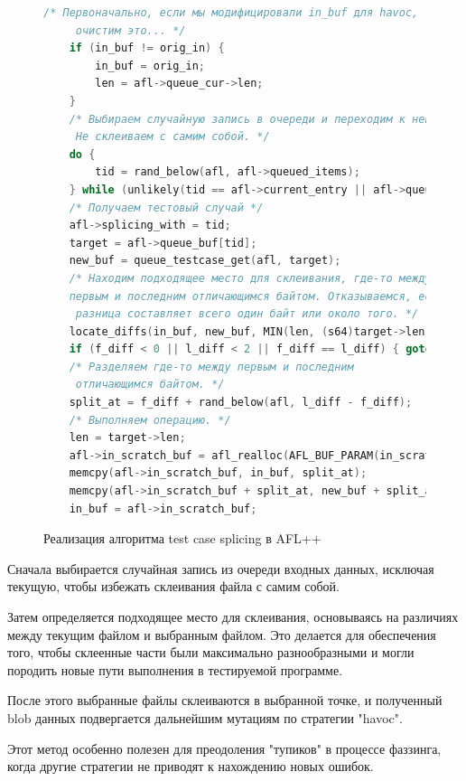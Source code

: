 \begin{figure}[ht]
	\begin{lstlisting}[language=C]
	/* Первоначально, если мы модифицировали in_buf для havoc,
	 очистим это... */
	if (in_buf != orig_in) {
		in_buf = orig_in;
		len = afl->queue_cur->len;
	}
	/* Выбираем случайную запись в очереди и переходим к ней.
	 Не склеиваем с самим собой. */
	do {
		tid = rand_below(afl, afl->queued_items);
	} while (unlikely(tid == afl->current_entry || afl->queue_buf[tid]->len < 4));
	/* Получаем тестовый случай */
	afl->splicing_with = tid;
	target = afl->queue_buf[tid];
	new_buf = queue_testcase_get(afl, target);
	/* Находим подходящее место для склеивания, где-то между 
	первым и последним отличающимся байтом.	Отказываемся, если
	 разница составляет всего один байт или около того. */
	locate_diffs(in_buf, new_buf, MIN(len, (s64)target->len), &f_diff, &l_diff);
	if (f_diff < 0 || l_diff < 2 || f_diff == l_diff) { goto retry_splicing; }
	/* Разделяем где-то между первым и последним
	 отличающимся байтом. */
	split_at = f_diff + rand_below(afl, l_diff - f_diff);
	/* Выполняем операцию. */
	len = target->len;
	afl->in_scratch_buf = afl_realloc(AFL_BUF_PARAM(in_scratch), len);
	memcpy(afl->in_scratch_buf, in_buf, split_at);
	memcpy(afl->in_scratch_buf + split_at, new_buf + split_at, len - split_at);
	in_buf = afl->in_scratch_buf;
	\end{lstlisting}
	\caption{Реализация алгоритма test case splicing в AFL++~\cite{???}}\label{fig:test-case-splicing}
\end{figure}

\newpage
Сначала выбирается случайная запись из очереди входных данных, исключая текущую, чтобы избежать склеивания файла с самим собой.

Затем определяется подходящее место для склеивания, основываясь на различиях между текущим файлом и выбранным файлом. Это делается для обеспечения того, чтобы склеенные части были максимально разнообразными и могли породить новые пути выполнения в тестируемой программе.

После этого выбранные файлы склеиваются в выбранной точке, и полученный blob данных подвергается дальнейшим мутациям по стратегии "havoc".

Этот метод особенно полезен для преодоления "тупиков" в процессе фаззинга, когда другие стратегии не приводят к нахождению новых ошибок.


%


%
